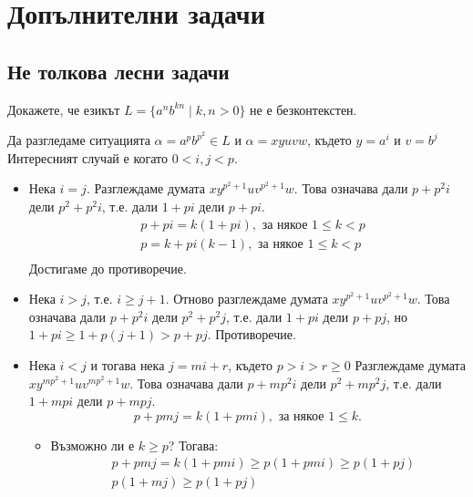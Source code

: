 \section{Допълнителни задачи}





\subsection{Не толкова лесни задачи}

\begin{problem}
  Докажете, че езикът $L = \{a^nb^{kn} \mid k,n > 0\}$ не е безконтекстен.
\end{problem}
\ifhints
\begin{hint}
  Да разгледаме ситуацията $\alpha = a^pb^{p^2}\in L$ и
  $\alpha = xyuvw$, където $y = a^i$ и $v = b^j$
  Интересният случай е когато $0 < i,j < p$.
  \begin{itemize}
  \item 
    Нека $i = j$.
    Разглеждаме думата $xy^{p^2+1}uv^{p^2+1}w$.
    Това означава дали $p+p^2i$ дели $p^2+p^2i$, т.е.
    дали $1 + pi$ дели $p+pi$.
    \begin{align*}
      & p + pi = k(1+pi), \text{ за някое }1 \leq k < p\\
      & p = k + pi(k-1), \text{ за някое }1 \leq k < p\\
    \end{align*}
    Достигаме до противоречие.
  \item
    Нека $i > j$, т.е. $i \geq j+1$.
    Отново разглеждаме думата $xy^{p^2+1}uv^{p^2+1}w$.
    Това означава дали $p+p^2i$ дели $p^2+p^2j$, т.е.
    дали $1 + pi$ дели $p+pj$, но
    $1+pi \geq 1 + p(j+1) > p + pj$.
    Противоречие.
  \item
    Нека $i < j$ и тогава нека $j = mi + r$, където $p > i > r \geq 0$
    Разглеждаме думата $xy^{mp^2+1}uv^{mp^2+1}w$.
    Това означава дали $p+mp^2i$ дели $p^2+mp^2j$, т.е.
    дали $1 + mpi$ дели $p+mpj$.
    \[p+pmj = k(1+pmi), \text{ за някое }1 \leq k.\]
    \begin{itemize}
    \item 
      Възможно ли е $k \geq p$? Тогава:
      \begin{align*}
        & p + pmj = k(1+pmi) \geq p(1+pmi) \geq p(1+pj)\\
        & p(1+mj) \geq p(1+pj)\\

\end{align*}
\end{itemize}
\end{itemize}
\end{hint}
